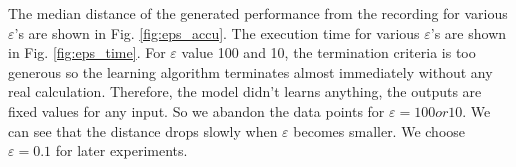 
%
%
The median distance of the generated performance from the recording for various $\varepsilon$'s are shown in Fig. \ref{fig:eps_accu}. The execution time for various $\varepsilon$'s are shown in Fig. \ref{fig:eps_time}. For $\varepsilon$ value 100 and 10, the termination criteria is too generous so the learning algorithm terminates almost immediately without any real calculation. Therefore, the model didn't learns anything, the outputs are fixed values for any input. So we abandon the data points for $\varepsilon = 100 or 10$. We can see that the distance drops slowly when $\varepsilon$ becomes smaller. We choose $\varepsilon = 0.1$ for later experiments. %

